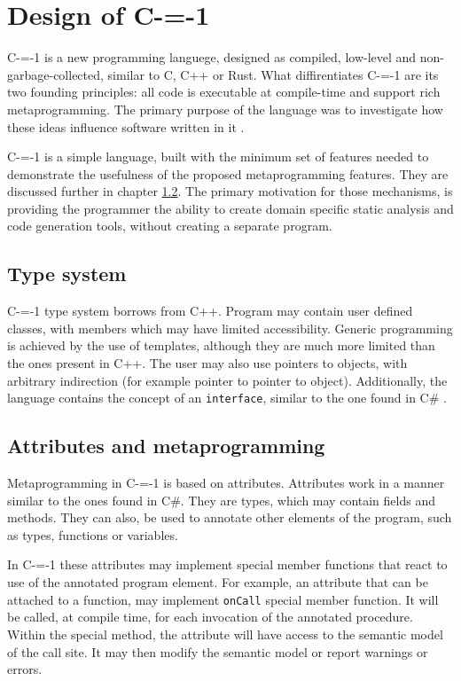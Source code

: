 \section{Design of C-=-1}
\label{language-design}
C-=-1 is a new programming languege, designed as compiled, low-level and non-garbage-collected, similar to C, C++ or Rust.
What diffirentiates C-=-1 are its two founding principles: all code is executable at compile-time and support rich metaprogramming.
The primary purpose of the language was to investigate how these ideas influence software written in it \cite{grabski2022compilation}.

C-=-1 is a simple language, built with the minimum set of features needed to demonstrate the usefulness of the proposed metaprogramming features.
They are discussed further in chapter \ref{design:attributes_and_metaprogramming}.
The primary motivation for those mechanisms, is providing the programmer the ability to create domain specific static analysis and code generation tools, without creating a separate program.

\subsection{Type system}

C-=-1 type system borrows from C++.
Program may contain user defined classes, with members which may have limited accessibility.
Generic programming is achieved by the use of templates, although they are much more limited than the ones present in C++.
The user may also use pointers to objects, with arbitrary indirection (for example pointer to pointer to object).
Additionally, the language contains the concept of an \lstinline{interface}, similar to the one found in C\# \cite{hejlsberg2003c}.

\subsection{Attributes and metaprogramming}
\label{design:attributes_and_metaprogramming}

Metaprogramming in C-=-1 is based on attributes.
Attributes work in a manner similar to the ones found in C\#.
They are types, which may contain fields and methods.
They can also, be used to annotate other elements of the program, such as types, functions or variables.

In C-=-1 these attributes may implement special member functions that react to use of the annotated program element.
For example, an attribute that can be attached to a function, may implement \lstinline{onCall} special member function.
It will be called, at compile time, for each invocation of the annotated procedure.
Within the special method, the attribute will have access to the semantic model of the call site.
It may then modify the semantic model or report warnings or errors.


